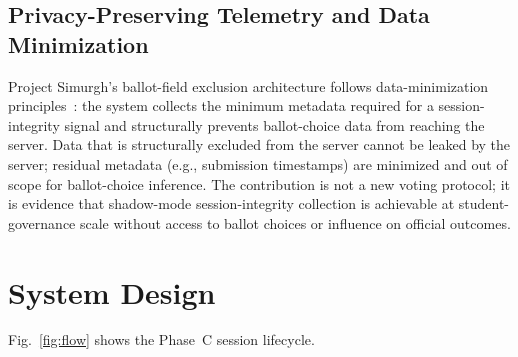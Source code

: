 \documentclass[conference]{IEEEtran}
\newcommand{\sys}{Project Simurgh}
\begin{document}
\subsection{Privacy-Preserving Telemetry and Data Minimization}

\sys{}'s ballot-field exclusion architecture follows data-minimization
principles~\cite{cavoukian2009privacy}: the system collects the minimum metadata
required for a session-integrity signal and structurally prevents ballot-choice
data from reaching the server. Data that is structurally excluded from the
server cannot be leaked by the server; residual metadata (e.g., submission
timestamps) are minimized and out of scope for ballot-choice inference. The
contribution is not a new voting protocol; it is evidence that shadow-mode
session-integrity collection is achievable at student-governance scale without
access to ballot choices or influence on official outcomes.

\section{System Design}
\label{sec:design}

Fig.~\ref{fig:flow} shows the Phase~C session lifecycle.
\end{document}

